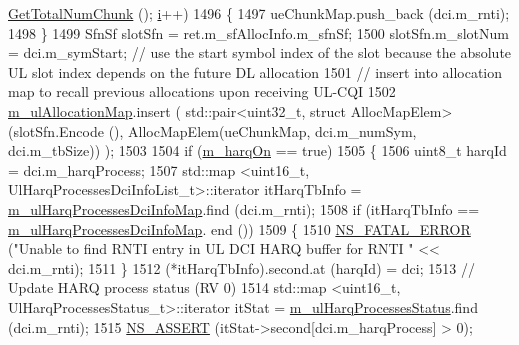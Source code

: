 \begin{DoxyCode}
      \hyperlink{classns3_1_1MmWavePhyMacCommon_a97e82c809a351fea9d5058ac1bb4c3c6}{GetTotalNumChunk} (); \hyperlink{bernuolliDistribution_8m_a6f6ccfcf58b31cb6412107d9d5281426}{i}++)
1496                         \{
1497                                 ueChunkMap.push\_back (dci.m\_rnti);
1498                         \}
1499                         SfnSf slotSfn = ret.m\_sfAllocInfo.m\_sfnSf;
1500                         slotSfn.m\_slotNum = dci.m\_symStart;  \textcolor{comment}{// use the start symbol index of the slot
       because the absolute UL slot index depends on the future DL allocation}
1501                         \textcolor{comment}{// insert into allocation map to recall previous allocations upon receiving UL-CQI}
1502                         \hyperlink{classns3_1_1MmWaveFlexTtiMacScheduler_ada4413d6867aaf28c116833458a62ea4}{m\_ulAllocationMap}.insert ( std::pair<uint32\_t, struct
       AllocMapElem> (slotSfn.Encode (), AllocMapElem(ueChunkMap, dci.m\_numSym, dci.m\_tbSize)) );
1503 
1504                         \textcolor{keywordflow}{if} (\hyperlink{classns3_1_1MmWaveFlexTtiMacScheduler_a832729b006315bb770e9f50c16305118}{m\_harqOn} == \textcolor{keyword}{true})
1505                         \{
1506                                 uint8\_t harqId = dci.m\_harqProcess;
1507                                 std::map <uint16\_t, UlHarqProcessesDciInfoList\_t>::iterator itHarqTbInfo = 
      \hyperlink{classns3_1_1MmWaveFlexTtiMacScheduler_ad18cf8a17f05488fc679bd891175864f}{m\_ulHarqProcessesDciInfoMap}.find (dci.m\_rnti);
1508                                 \textcolor{keywordflow}{if} (itHarqTbInfo == \hyperlink{classns3_1_1MmWaveFlexTtiMacScheduler_ad18cf8a17f05488fc679bd891175864f}{m\_ulHarqProcessesDciInfoMap}.
      end ())
1509                                 \{
1510                                         \hyperlink{group__fatal_ga5131d5e3f75d7d4cbfd706ac456fdc85}{NS\_FATAL\_ERROR} (\textcolor{stringliteral}{"Unable to find RNTI entry in UL DCI
       HARQ buffer for RNTI "} << dci.m\_rnti);
1511                                 \}
1512                                 (*itHarqTbInfo).second.at (harqId) = dci;
1513                                 \textcolor{comment}{// Update HARQ process status (RV 0)}
1514                                 std::map <uint16\_t, UlHarqProcessesStatus\_t>::iterator itStat = 
      \hyperlink{classns3_1_1MmWaveFlexTtiMacScheduler_af728e6ddeaaf55536ca842682904d64a}{m\_ulHarqProcessesStatus}.find (dci.m\_rnti);
1515                                 \hyperlink{assert_8h_a6dccdb0de9b252f60088ce281c49d052}{NS\_ASSERT} (itStat->second[dci.m\_harqProcess] > 0);

\end{DoxyCode}
